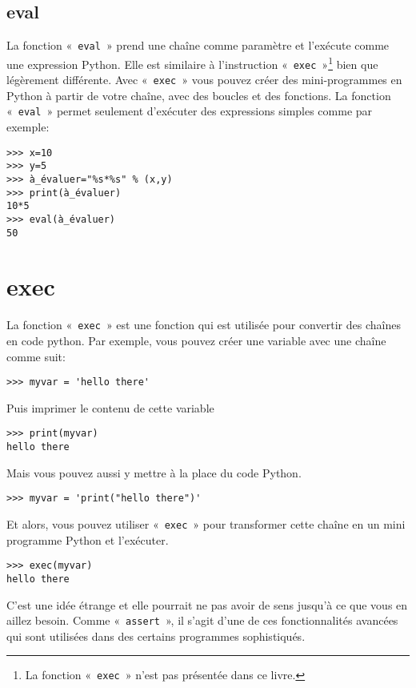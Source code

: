 \subsection*{eval}

La fonction «~\texttt{eval}~» prend une chaîne comme paramètre et l'exécute comme une expression Python. Elle est similaire à l'instruction «~\texttt{exec}~»\footnote{La fonction «~\texttt{exec}~» n'est pas présentée dans ce livre.} bien que légèrement différente. Avec «~\texttt{exec}~» vous pouvez créer des mini-programmes en Python à partir de votre chaîne, avec des boucles et des fonctions. La fonction «~\texttt{eval}~» permet seulement d'exécuter des expressions simples comme par exemple:
\begin{Verbatim}[frame=single,rulecolor=\color{gray}]
>>> x=10
>>> y=5
>>> à_évaluer="%s*%s" % (x,y)
>>> print(à_évaluer)
10*5
>>> eval(à_évaluer)
50
\end{Verbatim}

\section*{exec}

La fonction «~\texttt{exec}~» est une fonction qui est utilisée pour convertir des chaînes en code python. Par exemple, vous pouvez créer une variable avec une chaîne comme suit:
\begin{Verbatim}[frame=single,rulecolor=\color{gray}]
>>> myvar = 'hello there'
\end{Verbatim}

Puis imprimer le contenu de cette variable
\begin{Verbatim}[frame=single,rulecolor=\color{gray}]
>>> print(myvar)
hello there
\end{Verbatim}

Mais vous pouvez aussi y mettre à la place du code Python.
\begin{Verbatim}[frame=single,rulecolor=\color{gray}]
>>> myvar = 'print("hello there")'
\end{Verbatim}

Et alors, vous pouvez utiliser «~\texttt{exec}~» pour transformer cette chaîne en un mini programme Python et l'exécuter.
\begin{Verbatim}[frame=single,rulecolor=\color{gray}]
>>> exec(myvar)
hello there
\end{Verbatim}

C'est une idée étrange et elle pourrait ne pas avoir de sens jusqu'à ce que vous en aillez besoin. Comme «~\texttt{assert}~», il s'agit d'une de ces fonctionnalités   avancées qui sont utilisées dans des certains programmes sophistiqués.


